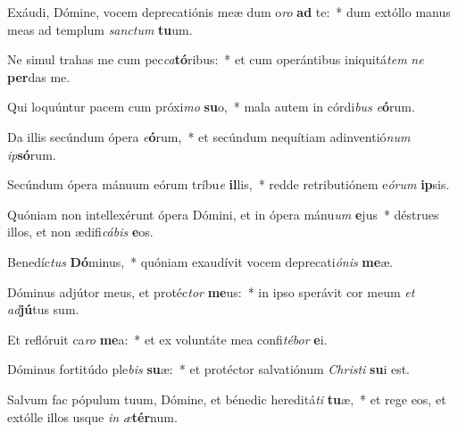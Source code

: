 \item Exáudi, Dómine, vocem deprecatiónis meæ dum o\textit{ro} \textbf{ad} te:~* dum extóllo manus meas ad templum \textit{sanc}\textit{tum} \textbf{tu}um.
\item Ne simul trahas me cum pec\textit{ca}\textbf{tó}ribus:~* et cum operántibus iniquitá\textit{tem} \textit{ne} \textbf{per}das me.
\item Qui loquúntur pacem cum próxi\textit{mo} \textbf{su}o,~* mala autem in córdi\textit{bus} \textit{e}\textbf{ó}rum.
\item Da illis secúndum ópera \textit{e}\textbf{ó}rum,~* et secúndum nequítiam adinventió\textit{num} \textit{ip}\textbf{só}rum.
\item Secúndum ópera mánuum eórum tríbu\textit{e} \textbf{il}lis,~* redde retributiónem e\textit{ó}\textit{rum} \textbf{ip}sis.
\item Quóniam non intellexérunt ópera Dómini, et in ópera mánu\textit{um} \textbf{e}jus~* déstrues illos, et non ædifi\textit{cá}\textit{bis} \textbf{e}os.
\item Benedíc\textit{tus} \textbf{Dó}minus,~* quóniam exaudívit vocem deprecati\textit{ó}\textit{nis} \textbf{me}æ.
\item Dóminus adjútor meus, et protéc\textit{tor} \textbf{me}us:~* in ipso sperávit cor meum \textit{et} \textit{ad}\textbf{jú}tus sum.
\item Et reflóruit ca\textit{ro} \textbf{me}a:~* et ex voluntáte mea confi\textit{té}\textit{bor} \textbf{e}i.
\item Dóminus fortitúdo ple\textit{bis} \textbf{su}æ:~* et protéctor salvatiónum \textit{Chris}\textit{ti} \textbf{su}i est.
\item Salvum fac pópulum tuum, Dómine, et bénedic hereditá\textit{ti} \textbf{tu}æ,~* et rege eos, et extólle illos usque \textit{in} \textit{æ}\textbf{tér}num.
